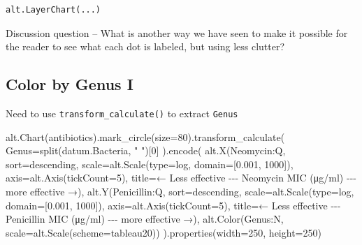 \documentclass[
  letterpaper,
  DIV=11,
  numbers=noendperiod]{scrartcl}
\newenvironment{Shaded}{\begin{snugshade}}{\end{snugshade}}
\newcommand{\BuiltInTok}[1]{\textcolor[rgb]{0.00,0.23,0.31}{#1}}
\newcommand{\DecValTok}[1]{\textcolor[rgb]{0.68,0.00,0.00}{#1}}
\newcommand{\FloatTok}[1]{\textcolor[rgb]{0.68,0.00,0.00}{#1}}
\newcommand{\NormalTok}[1]{\textcolor[rgb]{0.00,0.23,0.31}{#1}}
\newcommand{\OperatorTok}[1]{\textcolor[rgb]{0.37,0.37,0.37}{#1}}
\newcommand{\StringTok}[1]{\textcolor[rgb]{0.13,0.47,0.30}{#1}}
\begin{document}
\begin{verbatim}
alt.LayerChart(...)
\end{verbatim}

Discussion question -- What is another way we have seen to make it
possible for the reader to see what each dot is labeled, but using less
clutter?

\subsection{Color by Genus I}\label{color-by-genus-i}

Need to use \texttt{transform\_calculate()} to extract \texttt{Genus}

\begin{Shaded}
\begin{Highlighting}[]
\NormalTok{alt.Chart(antibiotics).mark\_circle(size}\OperatorTok{=}\DecValTok{80}\NormalTok{).transform\_calculate(}
\NormalTok{    Genus}\OperatorTok{=}\StringTok{\textquotesingle{}split(datum.Bacteria, " ")[0]\textquotesingle{}}
\NormalTok{).encode(}
\NormalTok{    alt.X(}\StringTok{\textquotesingle{}Neomycin:Q\textquotesingle{}}\NormalTok{,}
\NormalTok{          sort}\OperatorTok{=}\StringTok{\textquotesingle{}descending\textquotesingle{}}\NormalTok{,}
\NormalTok{          scale}\OperatorTok{=}\NormalTok{alt.Scale(}\BuiltInTok{type}\OperatorTok{=}\StringTok{\textquotesingle{}log\textquotesingle{}}\NormalTok{, domain}\OperatorTok{=}\NormalTok{[}\FloatTok{0.001}\NormalTok{, }\DecValTok{1000}\NormalTok{]),}
\NormalTok{          axis}\OperatorTok{=}\NormalTok{alt.Axis(tickCount}\OperatorTok{=}\DecValTok{5}\NormalTok{),}
\NormalTok{          title}\OperatorTok{=}\StringTok{\textquotesingle{}← Less effective {-}{-}{-} Neomycin MIC (μg/ml) {-}{-}{-} more effective →\textquotesingle{}}\NormalTok{),}
\NormalTok{    alt.Y(}\StringTok{\textquotesingle{}Penicillin:Q\textquotesingle{}}\NormalTok{,}
\NormalTok{          sort}\OperatorTok{=}\StringTok{\textquotesingle{}descending\textquotesingle{}}\NormalTok{,}
\NormalTok{          scale}\OperatorTok{=}\NormalTok{alt.Scale(}\BuiltInTok{type}\OperatorTok{=}\StringTok{\textquotesingle{}log\textquotesingle{}}\NormalTok{, domain}\OperatorTok{=}\NormalTok{[}\FloatTok{0.001}\NormalTok{, }\DecValTok{1000}\NormalTok{]),}
\NormalTok{          axis}\OperatorTok{=}\NormalTok{alt.Axis(tickCount}\OperatorTok{=}\DecValTok{5}\NormalTok{),}
\NormalTok{          title}\OperatorTok{=}\StringTok{\textquotesingle{}← Less effective {-}{-}{-} Penicillin MIC (μg/ml) {-}{-}{-} more effective →\textquotesingle{}}\NormalTok{),}
\NormalTok{    alt.Color(}\StringTok{\textquotesingle{}Genus:N\textquotesingle{}}\NormalTok{,}
\NormalTok{          scale}\OperatorTok{=}\NormalTok{alt.Scale(scheme}\OperatorTok{=}\StringTok{\textquotesingle{}tableau20\textquotesingle{}}\NormalTok{))}
\NormalTok{).properties(width}\OperatorTok{=}\DecValTok{250}\NormalTok{, height}\OperatorTok{=}\DecValTok{250}\NormalTok{)}
\end{Highlighting}
\end{Shaded}
\end{document}
